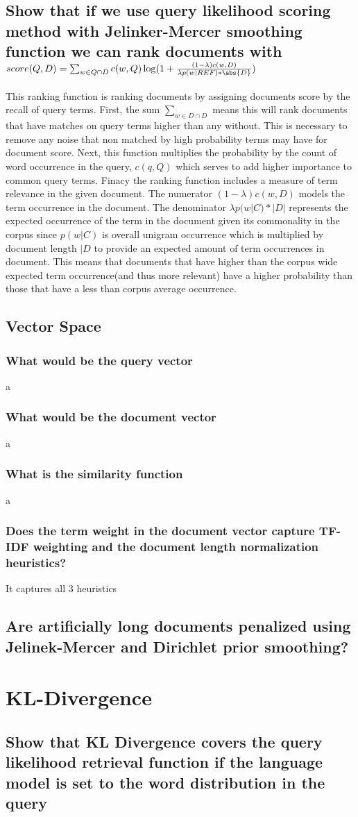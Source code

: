 \documentclass[11pt]{article}
\begin{document}
\subsection{Show that if we use query likelihood scoring method with Jelinker-Mercer smoothing function we can rank documents with \\$score(Q,D) = \sum_{w \in Q \cap D} c(w,Q)\log(1 + \frac{(1-\lambda)c(w,D)}{\lambda p (w| REF)*\abs{D}})$}
This ranking function is ranking documents by assigning documents score by the recall of query terms. First, the sum $\sum_{w \in D \cap D}$ means this will rank documents that have matches on query terms higher than any without. This is necessary to remove any noise that non matched by high probability terms may have for document score. Next, this function multiplies the probability by the count of word occurrence in the query, $c(q,Q)$ which serves to add higher importance to common query terms. Finacy the ranking function includes a measure of term relevance in the given document. The numerator $(1-\lambda)c(w,D)$ models the term occurrence in the document. The denominator $\lambda p(w|C)*|D|$ represents the expected occurrence of the term in the document given its commonality in the corpus since $p(w|C)$ is overall unigram occurrence which is multiplied by document length $|D$ to provide an expected amount of term occurrences in document. This means that documents that have higher than the corpus wide expected term occurrence(and thus more relevant) have a higher probability than those that have a less than corpus average occurrence. 
\subsection{Vector Space}
\subsubsection{What would be the query vector}
a
\subsubsection{What would be the document vector}
a
\subsubsection{What is the similarity function}
a
\subsubsection{Does the term weight in the document vector capture TF-IDF weighting and the document length normalization heuristics?}
It captures all 3 heuristics 
\subsection{Are artificially long documents penalized using Jelinek-Mercer and Dirichlet prior smoothing?}
\section{KL-Divergence}
\subsection{Show that KL Divergence covers the query likelihood retrieval function if the language model is set to the word distribution in the query}
\end{document}
